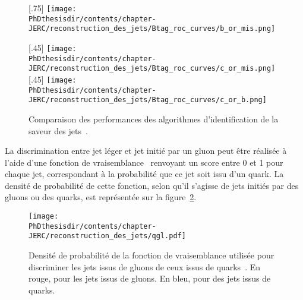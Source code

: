 \begin{figure}[h]
\centering

[.75\textwidth]
{\texttt{[image: \\PhDthesisdir/contents/chapter-JERC/reconstruction\_des\_jets/Btag\_roc\_curves/b\_or\_mis.png]}}

\vspace{\baselineskip}

[.45\textwidth]
{\texttt{[image: \\PhDthesisdir/contents/chapter-JERC/reconstruction\_des\_jets/Btag\_roc\_curves/c\_or\_mis.png]}}
\hfill
{}[.45\textwidth]
{\texttt{[image: \\PhDthesisdir/contents/chapter-JERC/reconstruction\_des\_jets/Btag\_roc\_curves/c\_or\_b.png]}}

\caption[Performances des algorithmes d'identification de la saveur des jets.]{Comparaison des performances des algorithmes d'identification de la saveur des jets~\cite{Sirunyan_heavy_flavor_jets_2018}.}
\label{fig-chapter-JERC-section-jets_reco-subsec-flavor-bc_tag_roc_curves}
\end{figure}
\par La discrimination entre jet léger et jet initié par un gluon peut être réalisée à l'aide d'une fonction de vraisemblance~\cite{CMS-PAS-JME-13-002} renvoyant un score entre 0 et 1 pour chaque jet, correspondant à la probabilité que ce jet soit issu d'un quark. La densité de probabilité de cette fonction, selon qu'il s'agisse de jets initiés par des gluons ou des quarks, est représentée sur la figure~\ref{fig-chapter-JERC-section-jets_reco-subsec-flavor-qgl_likelihood}.
\begin{figure}[h]
\centering
\texttt{[image: \\PhDthesisdir/contents/chapter-JERC/reconstruction\_des\_jets/qgl.pdf]}
\caption[Performances de la discrimation quark-gluon pour la saveur des jets.]{Densité de probabilité de la fonction de vraisemblance utilisée pour discriminer les jets issus de gluons de ceux issus de quarks~\cite{CMS-PAS-JME-13-002}. En rouge, pour les jets issus de gluons. En bleu, pour des jets issus de quarks.}
\label{fig-chapter-JERC-section-jets_reco-subsec-flavor-qgl_likelihood}
\end{figure}
